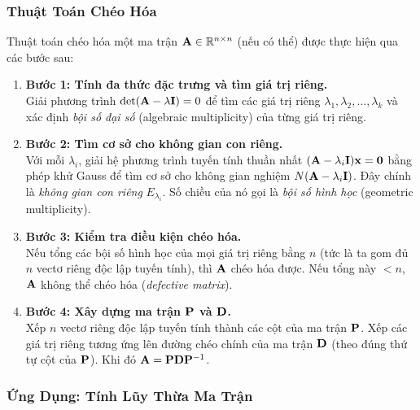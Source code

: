 \subsubsection{Thuật Toán Chéo Hóa}

Thuật toán chéo hóa một ma trận $\mathbf{A} \in \mathbb{R}^{n \times n}$ (nếu có thể) được thực hiện qua các bước sau:

\begin{tcolorbox}[enhanced, colback=blue!8!white, colframe=primaryblue,
    title=\textbf{Quy trình chéo hóa ma trận}, fonttitle=\bfseries]
\begin{enumerate}
    \item \textbf{Bước 1: Tính đa thức đặc trưng và tìm giá trị riêng.} \\
    Giải phương trình $\det(\mathbf{A} - \lambda\mathbf{I}) = 0$ để tìm các giá trị riêng $\lambda_1, \lambda_2, \ldots, \lambda_k$ và xác định \textit{bội số đại số} (algebraic multiplicity) của từng giá trị riêng.
    
    \item \textbf{Bước 2: Tìm cơ sở cho không gian con riêng.} \\
    Với mỗi $\lambda_i$, giải hệ phương trình tuyến tính thuần nhất $(\mathbf{A} - \lambda_i\mathbf{I})\mathbf{x} = \mathbf{0}$ bằng phép khử Gauss để tìm cơ sở cho không gian nghiệm $N(\mathbf{A} - \lambda_i\mathbf{I})$. Đây chính là \textit{không gian con riêng} $E_{\lambda_i}$. Số chiều của nó gọi là \textit{bội số hình học} (geometric multiplicity).
    
    \item \textbf{Bước 3: Kiểm tra điều kiện chéo hóa.} \\
    Nếu tổng các bội số hình học của mọi giá trị riêng bằng $n$ (tức là ta gom đủ $n$ vectơ riêng độc lập tuyến tính), thì $\mathbf{A}$ chéo hóa được. Nếu tổng này $< n$, $\mathbf{A}$ không thể chéo hóa (\textit{defective matrix}).
    
    \item \textbf{Bước 4: Xây dựng ma trận $\mathbf{P}$ và $\mathbf{D}$.} \\
    Xếp $n$ vectơ riêng độc lập tuyến tính thành các cột của ma trận $\mathbf{P}$. Xếp các giá trị riêng tương ứng lên đường chéo chính của ma trận $\mathbf{D}$ (theo đúng thứ tự cột của $\mathbf{P}$). Khi đó $\mathbf{A} = \mathbf{P}\mathbf{D}\mathbf{P}^{-1}$.
\end{enumerate}
\end{tcolorbox}

\subsubsection{Ứng Dụng: Tính Lũy Thừa Ma Trận}

